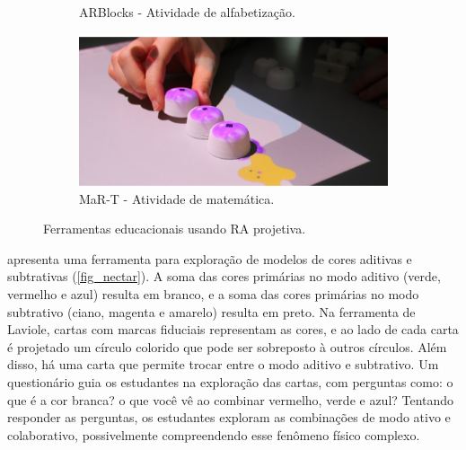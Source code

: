 \begin{figure}[h]
\begin{subfigure}{.49\textwidth}
        \caption{ARBlocks - Atividade de alfabetização.}
        \label{fig_silva_roberto_ra}
    \end{subfigure}
    \begin{subfigure}{.49\textwidth}
        \includegraphics[width=.9\linewidth,fbox]{figs/mart.png}
        \caption{MaR-T - Atividade de matemática.}
        \label{fig_math}
    \end{subfigure}
    \caption{Ferramentas educacionais usando RA projetiva.}
\end{figure}

 apresenta uma ferramenta para exploração de modelos de cores aditivas e subtrativas (\autoref{fig_nectar}). A soma das cores primárias no modo aditivo (verde, vermelho e azul) resulta em branco, e a soma das cores primárias no modo subtrativo (ciano, magenta e amarelo) resulta em preto. Na ferramenta de Laviole, cartas com marcas fiduciais representam as cores, e ao lado de cada carta é projetado um círculo colorido que pode ser sobreposto à outros círculos. Além disso, há uma carta que permite trocar entre o modo aditivo e subtrativo. Um questionário guia os estudantes na exploração das cartas, com perguntas como: o que é a cor branca? o que você vê ao combinar vermelho, verde e azul? Tentando responder as perguntas, os estudantes exploram as combinações de modo ativo e colaborativo, possivelmente compreendendo esse fenômeno físico complexo.

